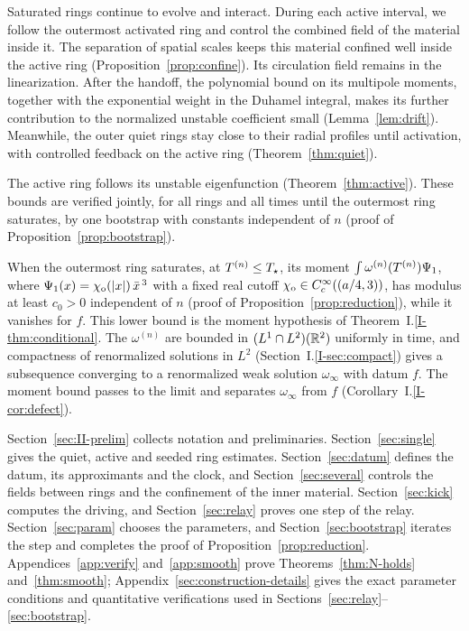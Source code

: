 Saturated rings continue to evolve and interact. During each active interval,
we follow the outermost activated ring and control the combined field of the
material inside it. The separation of spatial scales keeps this material
confined well inside the active ring (Proposition~\ref{prop:confine}). Its
circulation field remains in the linearization. After the handoff, the
polynomial bound on its multipole moments, together with the exponential
weight in the Duhamel integral, makes its further contribution to the
normalized unstable coefficient small (Lemma~\ref{lem:drift}). Meanwhile,
the outer quiet rings stay close to their radial profiles until activation,
with controlled feedback on the active ring (Theorem~\ref{thm:quiet}).

The active ring follows its unstable eigenfunction (Theorem~\ref{thm:active}).
These bounds are verified jointly, for all rings and all times until the outermost ring
saturates, by one bootstrap with constants independent of $n$ (proof of
Proposition~\ref{prop:bootstrap}).

When the outermost ring saturates, at $T^{(n)}\le T_\star$, its moment
$\int\omega^{(n)}(T^{(n)})\Psi_1$, where $\Psi_1(x)=\chi_{\mathrm{o}}(|x|)\,\bar x^{\,3}$
with a fixed real cutoff $\chi_{\mathrm{o}}\in C_c^\infty((a/4,3))$, has modulus at least
$c_0>0$ independent of $n$ (proof of Proposition~\ref{prop:reduction}), while
it vanishes for $f$. This lower bound is the moment hypothesis of
Theorem~I.\ref{I-thm:conditional}. The $\omega^{(n)}$ are bounded in
$(L^1\cap L^2)(\mathbb{R}^2)$ uniformly in time, and compactness of renormalized
solutions in $L^2$ (Section~I.\ref{I-sec:compact}) gives a subsequence
converging to a renormalized weak solution $\omega_\infty$ with datum $f$. The
moment bound passes to the limit and separates $\omega_\infty$ from $f$
(Corollary~I.\ref{I-cor:defect}).

Section~\ref{sec:II-prelim} collects notation and preliminaries.
Section~\ref{sec:single} gives the quiet, active and seeded ring estimates.
Section~\ref{sec:datum} defines the datum, its approximants and the clock,
and Section~\ref{sec:several} controls the fields between rings and the
confinement of the inner material. Section~\ref{sec:kick} computes the driving,
and Section~\ref{sec:relay} proves one step of the relay.
Section~\ref{sec:param} chooses the parameters, and Section~\ref{sec:bootstrap}
iterates the step and completes the proof of Proposition~\ref{prop:reduction}.
Appendices~\ref{app:verify} and~\ref{app:smooth}
prove Theorems~\ref{thm:N-holds} and~\ref{thm:smooth};
Appendix~\ref{sec:construction-details} gives the exact parameter conditions
and quantitative verifications used in Sections~\ref{sec:relay}--\ref{sec:bootstrap}.

